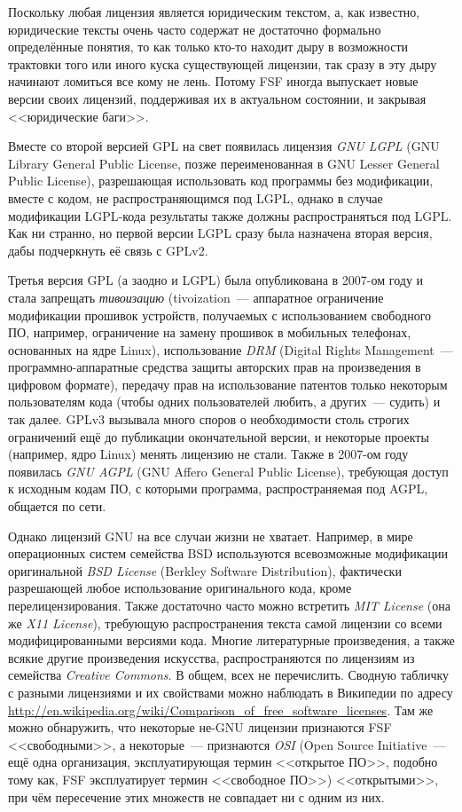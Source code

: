 Поскольку любая лицензия является юридическим текстом, а, как известно, юридические тексты очень часто содержат не достаточно формально определённые понятия, то как только кто-то находит дыру в возможности трактовки того или иного куска существующей лицензии, так сразу в эту дыру начинают ломиться все кому не лень.
Потому FSF иногда выпускает новые версии своих лицензий, поддерживая их в актуальном состоянии, и закрывая <<юридические баги>>.

Вместе со второй версией GPL на свет появилась лицензия \emph{GNU LGPL} (GNU Library General Public License, позже переименованная в GNU Lesser General Public License), разрешающая использовать код программы без модификации, вместе с кодом, не распространяющимся под LGPL, однако в случае модификации LGPL-кода результаты также должны распространяться под LGPL. Как ни странно, но первой версии LGPL сразу была назначена вторая версия, дабы подчеркнуть её связь с GPLv2.

Третья версия GPL (а заодно и LGPL) была опубликована в 2007-ом году и стала запрещать \emph{тивоизацию} (tivoization~--- аппаратное ограничение модификации прошивок устройств, получаемых с использованием свободного ПО, например, ограничение на замену прошивок в мобильных телефонах, основанных на ядре Linux), использование \emph{DRM} (Digital Rights Management~--- программно-аппаратные средства защиты авторских прав на произведения в цифровом формате), передачу прав на использование патентов только некоторым пользователям кода (чтобы одних пользователей любить, а других~--- судить) и так далее.
GPLv3 вызывала много споров о необходимости столь строгих ограничений ещё до публикации окончательной версии, и некоторые проекты (например, ядро Linux) менять лицензию не стали.
Также в 2007-ом году появилась \emph{GNU AGPL} (GNU Affero General Public License), требующая доступ к исходным кодам ПО, с которыми программа, распространяемая под AGPL, общается по сети.

Однако лицензий GNU на все случаи жизни не хватает.
Например, в мире операционных систем семейства BSD используются всевозможные модификации оригинальной \emph{BSD License} (Berkley Software Distribution), фактически разрешающей любое использование оригинального кода, кроме перелицензирования.
Также достаточно часто можно встретить \emph{MIT License} (она же \emph{X11 License}), требующую распространения текста самой лицензии со всеми модифицированными версиями кода.
Многие литературные произведения, а также всякие другие произведения искусства, распространяются по лицензиям из семейства \emph{Creative Commons}.
В общем, всех не перечислить.
Сводную табличку с разными лицензиями и их свойствами можно наблюдать в Википедии по адресу \url{http://en.wikipedia.org/wiki/Comparison_of_free_software_licenses}.
Там же можно обнаружить, что некоторые не-GNU лицензии признаются FSF <<свободными>>, а некоторые~--- признаются \emph{OSI} (Open Source Initiative~--- ещё одна организация, эксплуатирующая термин <<открытое ПО>>, подобно тому как, FSF эксплуатирует термин <<свободное ПО>>) <<открытыми>>, при чём пересечение этих множеств не совпадает ни с одним из них.


